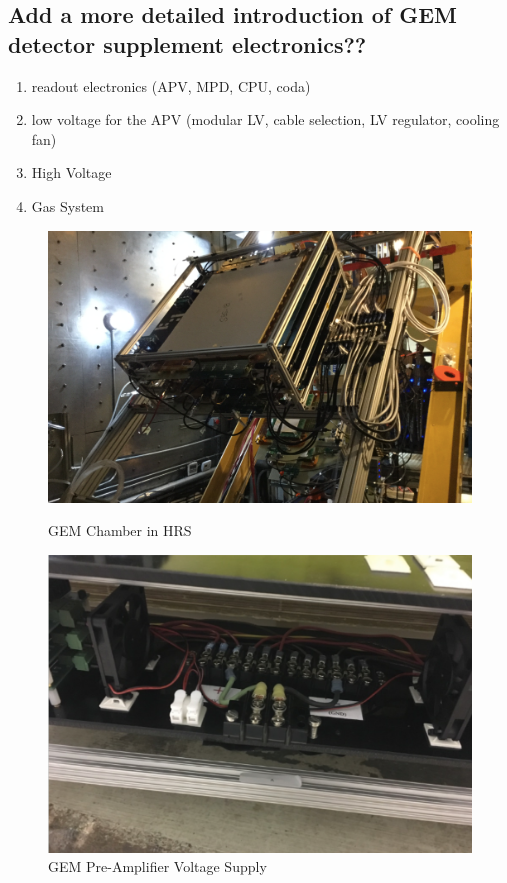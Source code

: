 \subsection{Add a more detailed introduction of GEM detector supplement electronics??}
\begin{enumerate}
    \item readout electronics (APV, MPD, CPU, coda)
    \item low voltage for the APV (modular LV, cable selection, LV regulator, cooling fan) 
    \item High Voltage
    \item Gas System
\end{enumerate}


\begin{figure}[!htbp]
  \centering
  \begin{minipage}[b]{0.45\textwidth}
    \includegraphics[width=\textwidth]{images/chap5/gem_in_hrs.png}
    \caption{GEM Chamber in HRS}
  \end{minipage}
  \hfill
  \begin{minipage}[b]{0.45\textwidth}
    \includegraphics[width=\textwidth]{images/chap5/gem_low_voltage.png}
    \caption{GEM Pre-Amplifier Voltage Supply}
  \end{minipage}
\end{figure}



